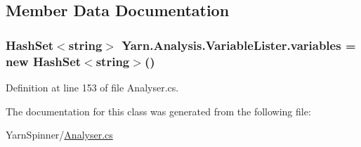 \subsection{Member Data Documentation}
\hypertarget{a00168_a64ed6c3394c474b6cf5804a35f560746}{
\subsubsection[{variables}]{\setlength{\rightskip}{0pt plus 5cm}Hash\-Set$<$string$>$ Yarn.\-Analysis.\-Variable\-Lister.\-variables = new Hash\-Set$<$string$>$()\hspace{0.3cm}{\ttfamily [private]}}}\label{a00168_a64ed6c3394c474b6cf5804a35f560746}


Definition at line 153 of file Analyser.\-cs.



The documentation for this class was generated from the following file\-:\begin{DoxyCompactItemize}
\item 
Yarn\-Spinner/\hyperlink{a00282}{Analyser.\-cs}\end{DoxyCompactItemize}
